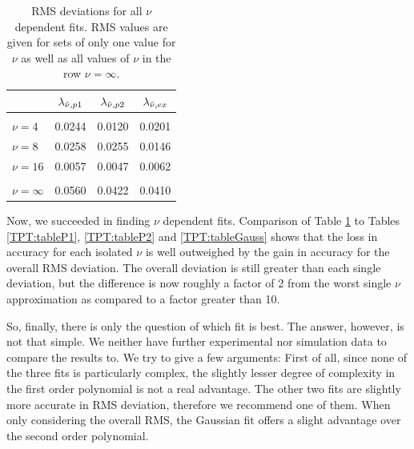 \documentclass[8.5pt,twoside,twocolumn]{article}
\theoremstyle{standard}
\begin{document}
\begin{table}[h]
  \centering
  \caption{RMS deviations for all $\nu$ dependent fits. RMS values are given for sets of only
  one value for $\nu$ as well as all values of $\nu$ in the row $\nu=\infty$.}
    \begin{tabular}{l | ccc}
         & $\lambda_{\tilde \nu,{p1}}$ & $\lambda_{\tilde \nu,{p2}}$ & $\lambda_{\tilde \nu,{ex}}$\\[2pt] 
    \hline
    & & \\[-.25cm]
    $\nu=4$ & 0.0244 & 0.0120 & 0.0201 \\
    $\nu=8$ & 0.0258 & 0.0255 & 0.0146 \\
    $\nu=16$ & 0.0057 & 0.0047 & 0.0062\\[2pt] \hline
    & & & \\[-.32cm]
    $\nu=\infty$ &  0.0560 & 0.0422 & 0.0410 \\[2pt]
    \hline
    \end{tabular}%
    \label{TPT:table:NdepRMS}
\end{table}%
Now, we succeeded in finding $\nu$ dependent fits. Comparison of Table \ref{TPT:table:NdepRMS}
to Tables \ref{TPT:tableP1}, \ref{TPT:tableP2} and \ref{TPT:tableGauss} shows that
the loss in accuracy for each isolated $\nu$ is well outweighed by the gain in accuracy
for the overall RMS deviation. The overall deviation is still greater than each single
deviation, but the difference is now roughly a factor of 2 from the worst single $\nu$ approximation
as compared to a factor greater than 10. 

So, finally, there is only the question of which fit is best. The answer, however, is not that
simple. We neither have further experimental nor simulation data to compare the
results to. We try to give a few arguments: First of all, since none of the three
fits is particularly complex, the slightly lesser degree of complexity in the first
order polynomial is not a real advantage. The other two fits are slightly more accurate
in RMS deviation, therefore we recommend one of them. When only considering the overall RMS, the
Gaussian fit offers a slight advantage over the second order polynomial.   
\end{document}
